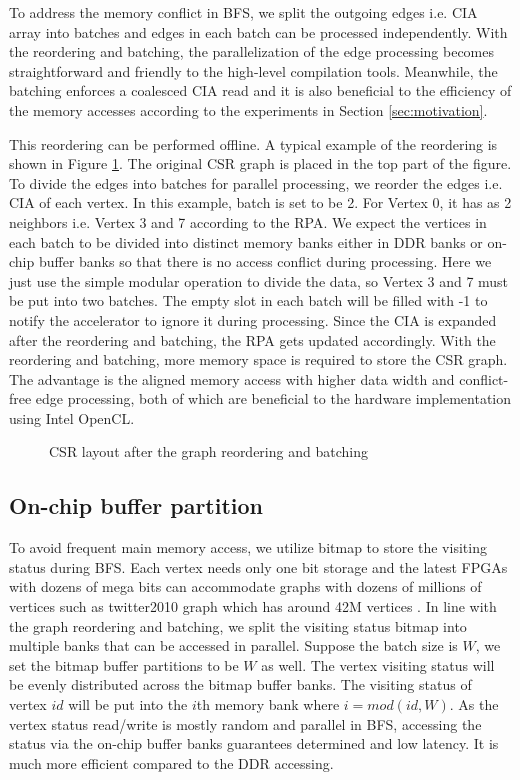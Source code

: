 To address the memory conflict in BFS, we split the outgoing edges i.e. CIA array 
into batches and edges in each batch can be processed independently.
With the reordering and batching, the parallelization of the edge processing 
becomes straightforward and friendly to the high-level compilation tools.
Meanwhile, the batching enforces a coalesced CIA read and it is also beneficial to 
the efficiency of the memory accesses according to the experiments in Section \ref{sec:motivation}. 

This reordering can be performed offline. A typical example of the reordering is shown in Figure \ref{fig:graph-reorder}. 
The original CSR graph is placed in the top part of the figure. 
To divide the edges into batches for parallel processing, we reorder the edges i.e. CIA 
of each vertex. In this example, batch is set to be 2. For Vertex 0, 
it has as 2 neighbors i.e. Vertex 3 and 7 according to the RPA. 
We expect the vertices in each batch to be divided into distinct memory 
banks either in DDR banks or on-chip buffer banks so that there is no 
access conflict during processing. Here we just use the simple modular 
operation to divide the data, so Vertex 3 and 7 must be put into two batches.
The empty slot in each batch will be filled with -1 to notify the accelerator to 
ignore it during processing. Since the CIA is expanded after 
the reordering and batching, the RPA gets updated accordingly.
With the reordering and batching, more memory space is required to store the 
CSR graph. The advantage is the aligned memory access 
with higher data width and conflict-free edge processing, 
both of which are beneficial to the hardware implementation 
using Intel OpenCL.

\begin{figure}
    \caption{CSR layout after the graph reordering and batching}
\label{fig:graph-reorder}
\vspace{-1em}
\end{figure}

\subsection{On-chip buffer partition}
To avoid frequent main memory access, we utilize bitmap to store 
the visiting status during BFS. Each vertex needs only one bit 
storage and the latest FPGAs with dozens of mega bits can accommodate 
graphs with dozens of millions of vertices such as twitter2010 graph which has 
around 42M vertices \cite{boldi2011layered}. In line with the graph reordering 
and batching, we split the visiting status bitmap into multiple banks that 
can be accessed in parallel. Suppose the batch size is $W$, we set the 
bitmap buffer partitions to be $W$ as well. The vertex visiting status will 
be evenly distributed across the bitmap buffer banks. The visiting status of 
vertex $id$ will be put into the $i$th memory bank where $i = mod(id, W)$.
As the vertex status read/write is mostly random and parallel in BFS, 
accessing the status via the on-chip buffer banks guarantees determined 
and low latency. It is much more efficient compared to the DDR 
accessing. 

